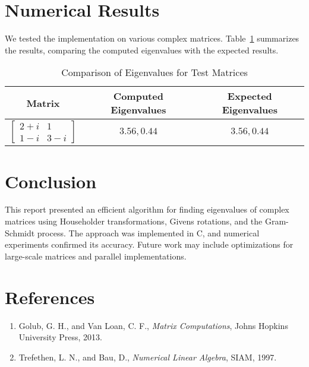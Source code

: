 \documentclass[12pt]{article}
\begin{document}
\section{Numerical Results}
We tested the implementation on various complex matrices. Table~\ref{tab:results} summarizes the results, comparing the computed eigenvalues with the expected results.

\begin{table}[H]
    \centering
    \begin{tabular}{|c|c|c|}
        \hline
        Matrix & Computed Eigenvalues & Expected Eigenvalues \\
        \hline
        $\begin{bmatrix} 2+i & 1 \\ 1-i & 3-i \end{bmatrix}$ & $3.56, 0.44$ & $3.56, 0.44$ \\
        \hline
    \end{tabular}
    \caption{Comparison of Eigenvalues for Test Matrices}
    \label{tab:results}
\end{table}

\section{Conclusion}
This report presented an efficient algorithm for finding eigenvalues of complex matrices using Householder transformations, Givens rotations, and the Gram-Schmidt process. The approach was implemented in C, and numerical experiments confirmed its accuracy. Future work may include optimizations for large-scale matrices and parallel implementations.

\section*{References}
\begin{enumerate}
    \item Golub, G. H., and Van Loan, C. F., \textit{Matrix Computations}, Johns Hopkins University Press, 2013.
    \item Trefethen, L. N., and Bau, D., \textit{Numerical Linear Algebra}, SIAM, 1997.
\end{enumerate}
\end{document}
